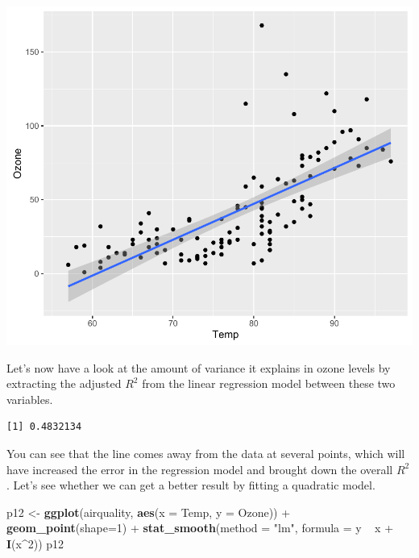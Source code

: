 \documentclass[]{article}
\newenvironment{Shaded}{\begin{snugshade}}{\end{snugshade}}
\newcommand{\KeywordTok}[1]{\textcolor[rgb]{0.13,0.29,0.53}{\textbf{{#1}}}}
\newcommand{\DataTypeTok}[1]{\textcolor[rgb]{0.13,0.29,0.53}{{#1}}}
\newcommand{\DecValTok}[1]{\textcolor[rgb]{0.00,0.00,0.81}{{#1}}}
\newcommand{\StringTok}[1]{\textcolor[rgb]{0.31,0.60,0.02}{{#1}}}
\newcommand{\NormalTok}[1]{{#1}}
\begin{document}
\begin{center}\includegraphics{12_Lowess_Plots_pdf/lowess_2-1} \end{center}

Let's now have a look at the amount of variance it explains in ozone
levels by extracting the adjusted \(R^2\) from the linear regression
model between these two variables.

\begin{Shaded}
\end{Shaded}

\begin{verbatim}
[1] 0.4832134
\end{verbatim}

You can see that the line comes away from the data at several points,
which will have increased the error in the regression model and brought
down the overall \(R^2\). Let's see whether we can get a better result
by fitting a quadratic model.

\begin{Shaded}
\begin{Highlighting}[]
\NormalTok{p12 <-}\StringTok{ }\KeywordTok{ggplot}\NormalTok{(airquality, }\KeywordTok{aes}\NormalTok{(}\DataTypeTok{x =} \NormalTok{Temp, }\DataTypeTok{y =} \NormalTok{Ozone)) +}\StringTok{ }
\StringTok{  }\KeywordTok{geom_point}\NormalTok{(}\DataTypeTok{shape=}\DecValTok{1}\NormalTok{) +}\StringTok{ }
\StringTok{  }\KeywordTok{stat_smooth}\NormalTok{(}\DataTypeTok{method =} \StringTok{"lm"}\NormalTok{, }\DataTypeTok{formula =} \NormalTok{y ~}\StringTok{ }\NormalTok{x +}\StringTok{ }\KeywordTok{I}\NormalTok{(x^}\DecValTok{2}\NormalTok{))}
\NormalTok{p12}
\end{Highlighting}
\end{Shaded}
\end{document}
